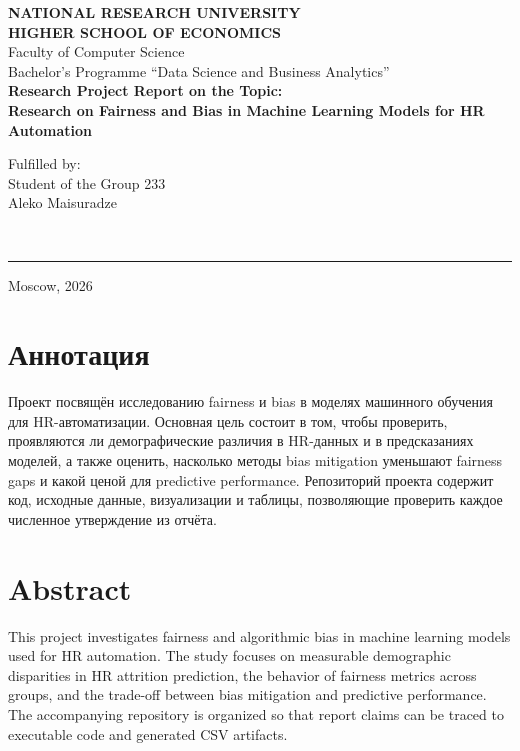 \documentclass[12pt]{article}
\begin{document}
\begin{titlepage}
\begin{center}
\textbf{NATIONAL RESEARCH UNIVERSITY}\\
\textbf{HIGHER SCHOOL OF ECONOMICS}\\[1.2cm]
Faculty of Computer Science\\
Bachelor's Programme ``Data Science and Business Analytics''\\[2.2cm]
\textbf{Research Project Report on the Topic:}\\[0.4cm]
\textbf{Research on Fairness and Bias in Machine Learning Models for HR Automation}\\[3.0cm]
\end{center}

\noindent
\begin{minipage}[t]{0.58\textwidth}
Fulfilled by:\\
Student of the Group 233\\
Aleko Maisuradze
\end{minipage}%
\begin{minipage}[t]{0.42\textwidth}
\\[-0.4em]
\rule{0.9\linewidth}{0.4pt}
\end{minipage}

\vfill
\begin{center}
Moscow, 2026
\end{center}
\end{titlepage}

\tableofcontents
\newpage

\section*{Аннотация}
Проект посвящён исследованию fairness и bias в моделях машинного обучения для HR-автоматизации. Основная цель состоит в том, чтобы проверить, проявляются ли демографические различия в HR-данных и в предсказаниях моделей, а также оценить, насколько методы bias mitigation уменьшают fairness gaps и какой ценой для predictive performance. Репозиторий проекта содержит код, исходные данные, визуализации и таблицы, позволяющие проверить каждое численное утверждение из отчёта.

\section*{Abstract}
This project investigates fairness and algorithmic bias in machine learning models used for HR automation. The study focuses on measurable demographic disparities in HR attrition prediction, the behavior of fairness metrics across groups, and the trade-off between bias mitigation and predictive performance. The accompanying repository is organized so that report claims can be traced to executable code and generated CSV artifacts.
\end{document}
